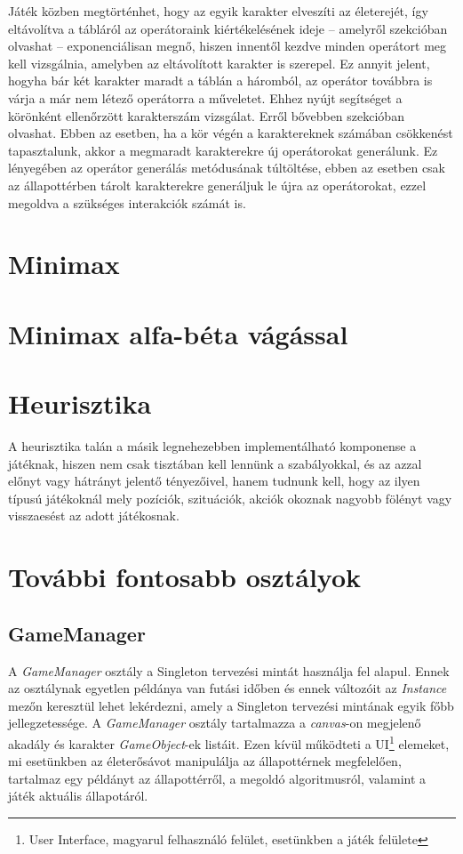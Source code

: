 \documentclass[
]{thesis-ekf}
\theoremstyle{definition}
\theoremstyle{remark}
\begin{document}
Játék közben megtörténhet, hogy az egyik karakter elveszíti az életerejét, így eltávolítva a tábláról az operátoraink kiértékelésének ideje -- amelyről  szekcióban olvashat -- exponenciálisan megnő, hiszen innentől kezdve minden operátort meg kell vizsgálnia, amelyben az eltávolított karakter is szerepel. Ez annyit jelent, hogyha bár két karakter maradt a táblán a háromból, az operátor továbbra is várja a már nem létező operátorra a műveletet. Ehhez nyújt segítséget a körönként ellenőrzött karakterszám vizsgálat. Erről bővebben  szekcióban olvashat. Ebben az esetben, ha a kör végén a karaktereknek számában csökkenést tapasztalunk, akkor a megmaradt karakterekre új operátorokat generálunk. Ez lényegében az operátor generálás metódusának túltöltése, ebben az esetben csak az állapottérben tárolt karakterekre generáljuk le újra az operátorokat, ezzel megoldva a szükséges interakciók számát is.

\section{Minimax} \label{minimax}

\section{Minimax alfa-béta vágással} \label{minimaxalphabeta}

\section{Heurisztika} \label{heuristics}

A heurisztika talán a másik legnehezebben implementálható komponense a játéknak, hiszen nem csak tisztában kell lennünk a szabályokkal, és az azzal előnyt vagy hátrányt jelentő tényezőivel, hanem tudnunk kell, hogy az ilyen típusú játékoknál mely pozíciók, szituációk, akciók okoznak nagyobb fölényt vagy visszaesést az adott játékosnak. 

\section{További fontosabb osztályok} 

\subsection{GameManager} \label{gamemanager}

A \emph{GameManager} osztály a Singleton tervezési mintát használja fel alapul. Ennek az osztálynak egyetlen példánya van futási időben és ennek változóit az \emph{Instance} mezőn keresztül lehet lekérdezni, amely a Singleton tervezési mintának egyik főbb jellegzetessége. A \emph{GameManager} osztály tartalmazza a \emph{canvas}-on megjelenő akadály és karakter \emph{GameObject}-ek listáit. Ezen kívül működteti a UI\footnote{User Interface, magyarul felhasználó felület, esetünkben a játék felülete} elemeket, mi esetünkben az életerősávot manipulálja az állapottérnek megfelelően, tartalmaz egy példányt az állapottérről, a megoldó algoritmusról, valamint a játék aktuális állapotáról.
\end{document}
